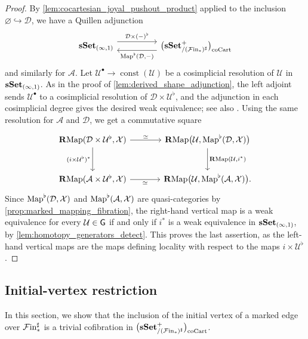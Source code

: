 \documentclass[10pt,reqno]{amsart}
\begin{document}
\begin{proof}
By \cref{lem:cocartesian_joyal_pushout_product} applied to the
inclusion $\varnothing\hookrightarrow\mathcal D$, we have a Quillen
adjunction
\[
\begin{tikzcd}[ampersand replacement=\&,column sep=huge]
\sset_{(\infty,1)}
\arrow[r,shift left=1.2ex,"\mathcal D\times(-)^\flat"]
\&\cocart
\arrow[l,shift left=1.2ex,"{\Map^\flat(\mathcal D,-)}"]
\end{tikzcd}
\]
and similarly for $\mathcal A$. Let
$\mathcal U^\bullet\to\operatorname{const}(\mathcal U)$ be a
cosimplicial resolution of $\mathcal U$ in $\mathbf{sSet}_{(\infty,1)}$.
As in the proof of \cref{lem:derived_shape_adjunction}, the left
adjoint sends $\mathcal U^\bullet$ to a cosimplicial resolution of
$\mathcal D\times\mathcal U^\flat$, and the adjunction in each
cosimplicial degree gives the desired weak equivalence; see also
\cite[Proposition~17.4.16\textup{(1)}]{hirschhorn2003model}. Using the
same resolution for $\mathcal A$ and $\mathcal D$, we get a
commutative square
\[
\begin{tikzcd}[ampersand replacement=\&, sep=large]
\RMap(\mathcal D\times\mathcal U^\flat,\mathcal X)
\arrow[r,"\simeq"]\arrow[d,"(i\times\mathcal U^\flat)^*"']
\&\RMap\bigl(\mathcal U,\Map^\flat(\mathcal D,\mathcal X)\bigr)
\arrow[d,"{\RMap(\mathcal U,i^*)}"]\\
\RMap(\mathcal A\times\mathcal U^\flat,\mathcal X)
\arrow[r,"\simeq"']
\&\RMap\bigl(\mathcal U,\Map^\flat(\mathcal A,\mathcal X)\bigr).
\end{tikzcd}
\]
Since $\operatorname{Map}^\flat(\mathcal D,\mathcal X)$ and
$\operatorname{Map}^\flat(\mathcal A,\mathcal X)$ are quasi-categories by
\cref{prop:marked_mapping_fibration}, the right-hand vertical map is a
weak equivalence for every $\mathcal U\in\mathsf G$ if and only if
$i^*$ is a weak equivalence in $\mathbf{sSet}_{(\infty,1)}$, by
\cref{lem:homotopy_generators_detect}. This proves the last assertion,
as the left-hand vertical maps are the maps defining locality with
respect to the maps $i\times\mathcal U^\flat$.
\end{proof}

\subsection{Initial-vertex restriction}
\label{subsec:enriched_marked_simplices}

In this section, we show that the inclusion of the initial vertex of a
marked edge over $\mathcal{F}\mathrm{in}_*^\sharp$ is a trivial cofibration in
$\bigl(\mathbf{sSet}^+_{/(\mathcal{F}\mathrm{in}_*)^\sharp}\bigr)_{\mathrm{coCart}}$.
\end{document}
